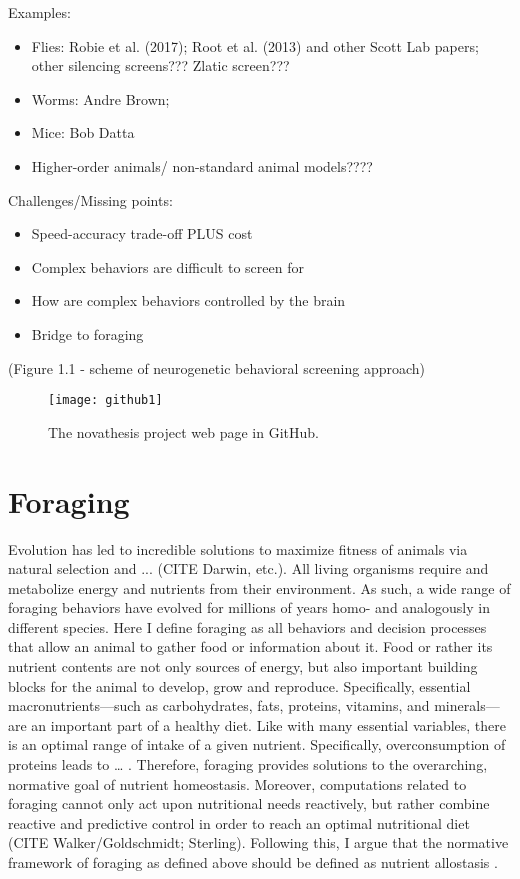Examples:
\begin{itemize}
\item Flies: Robie et al. (2017); Root et al. (2013) and other Scott Lab papers; other silencing screens??? Zlatic screen???
\item Worms: Andre Brown;
\item Mice: Bob Datta
\item Higher-order animals/ non-standard animal models????
\end{itemize}
Challenges/Missing points:
\begin{itemize}
\item Speed-accuracy trade-off PLUS cost
\item Complex behaviors are difficult to screen for
\item How are complex behaviors controlled by the brain
\item Bridge to foraging
\end{itemize}

(Figure 1.1 - scheme of neurogenetic behavioral screening approach)


\begin{figure}[htbp]
  \centering
    \texttt{[image: github1]}
  \caption{The \gls{novathesis} project web page in GitHub.}
  \label{fig:github}
\end{figure}

\section{Foraging}
\label{sec:foraging}

Evolution has led to incredible solutions to maximize fitness of animals via natural selection and ... \needscite(CITE Darwin, etc.). All living organisms require and metabolize energy and nutrients from their environment. As such, a wide range of foraging behaviors have evolved for millions of years homo- and analogously in different species. Here I define foraging as all behaviors and decision processes that allow an animal to gather food or information about it. Food or rather its nutrient contents are not only sources of energy, but also important building blocks for the animal to develop, grow and reproduce. Specifically, essential macronutrients—such as carbohydrates, fats, proteins, vitamins, and minerals—are an important part of a healthy diet. Like with many essential variables, there is an optimal range of intake of a given nutrient. Specifically, overconsumption of proteins leads to … . Therefore, foraging provides solutions to the overarching, normative goal of nutrient homeostasis. Moreover, computations related to foraging cannot only act upon nutritional needs reactively, but rather combine reactive and predictive control in order to reach an optimal nutritional diet \needscite(CITE Walker/Goldschmidt; Sterling). Following this, I argue that the normative framework of foraging as defined above should be defined as nutrient allostasis \needscite.

